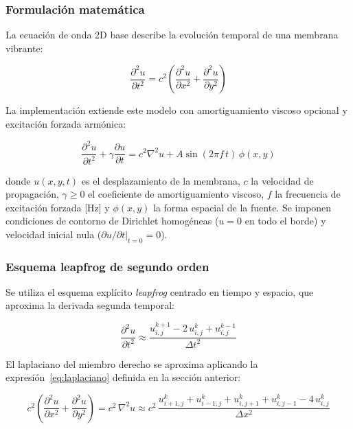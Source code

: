 \documentclass[12pt, a4paper]{article}
\begin{document}
\subsubsection{Formulación matemática}

La ecuación de onda 2D base describe la evolución temporal de una membrana vibrante:

\begin{equation}
    \frac{\partial^2 u}{\partial t^2} = c^2
    \left(\frac{\partial^2 u}{\partial x^2} + \frac{\partial^2 u}{\partial y^2}\right)
    \label{eq:onda2d}
\end{equation}

La implementación extiende este modelo con amortiguamiento viscoso opcional y
excitación forzada armónica:

\begin{equation}
    \frac{\partial^2 u}{\partial t^2} + \gamma\frac{\partial u}{\partial t} =
    c^2\nabla^2 u + A\sin(2\pi f\,t)\,\phi(x,y)
    \label{eq:onda2d-ext}
\end{equation}

donde $u(x,y,t)$ es el desplazamiento de la membrana, $c$ la velocidad de propagación,
$\gamma \geq 0$ el coeficiente de amortiguamiento viscoso, $f$ la frecuencia de
excitación forzada [Hz] y $\phi(x,y)$ la forma espacial de la fuente. Se imponen
condiciones de contorno de Dirichlet homogéneas ($u = 0$ en todo el borde) y velocidad
inicial nula ($\partial u/\partial t\big|_{t=0} = 0$).

\subsubsection{Esquema leapfrog de segundo orden}

Se utiliza el esquema explícito \textit{leapfrog} centrado en tiempo y espacio, que
aproxima la derivada segunda temporal:

\begin{equation}
    \frac{\partial^2 u}{\partial t^2} \approx
    \frac{u^{k+1}_{i,j} - 2\,u^k_{i,j} + u^{k-1}_{i,j}}{\Delta t^2}
\end{equation}

El laplaciano del miembro derecho se aproxima aplicando la expresión~\eqref{eq:laplaciano}
definida en la sección anterior:

\begin{equation}
    c^2\!\left(\frac{\partial^2 u}{\partial x^2} + \frac{\partial^2 u}{\partial y^2}\right)
    = c^2\,\nabla^2 u \approx
    c^2\,\frac{u^k_{i+1,j} + u^k_{i-1,j} + u^k_{i,j+1} + u^k_{i,j-1} - 4\,u^k_{i,j}}
              {\Delta x^2}
\end{equation}
\end{document}
